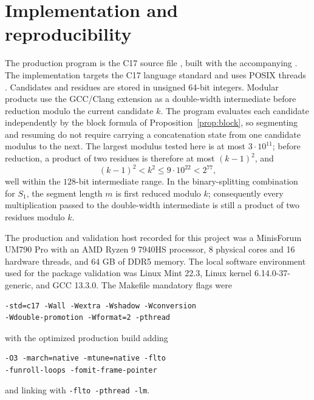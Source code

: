 \documentclass[11pt]{article}
\theoremstyle{definition}
\theoremstyle{remark}
\begin{document}
\section{Implementation and reproducibility}
\label{sec:impl}

The production program is the C17 source file , built
with the accompanying .  The implementation targets the C17
language standard \cite{isoC17} and uses POSIX threads \cite{posix2017}.
Candidates and residues are stored in unsigned 64-bit integers.  Modular
products use the GCC/Clang extension  as a double-width
intermediate before reduction modulo the current candidate \(k\).  The program
evaluates each candidate independently by the block formula of
Proposition~\ref{prop:block}, so segmenting and resuming do not require
carrying a concatenation state from one candidate modulus to the next.
The largest modulus tested here is at most \(3\cdot 10^{11}\); before
reduction, a product of two residues is therefore at most \((k-1)^2\), and
\[
  (k-1)^2 < k^2 \le 9\cdot 10^{22} < 2^{77},
\]
well within the \(128\)-bit intermediate range.  In the binary-splitting
combination for \(S_1\), the segment length \(m\) is first reduced modulo
\(k\); consequently every multiplication passed to the double-width
intermediate is still a product of two residues modulo \(k\).

The production and validation host recorded for this project was a MinisForum
UM790 Pro with an AMD Ryzen 9 7940HS processor, 8 physical cores and 16
hardware threads, and 64 GB of DDR5 memory.  The local software environment
used for the package validation was Linux Mint 22.3, Linux kernel
6.14.0-37-generic, and GCC 13.3.0.  The Makefile mandatory flags were
\begin{verbatim}
-std=c17 -Wall -Wextra -Wshadow -Wconversion
-Wdouble-promotion -Wformat=2 -pthread
\end{verbatim}
with the optimized production build adding
\begin{verbatim}
-O3 -march=native -mtune=native -flto
-funroll-loops -fomit-frame-pointer
\end{verbatim}
and linking with \texttt{-flto -pthread -lm}.
\end{document}
